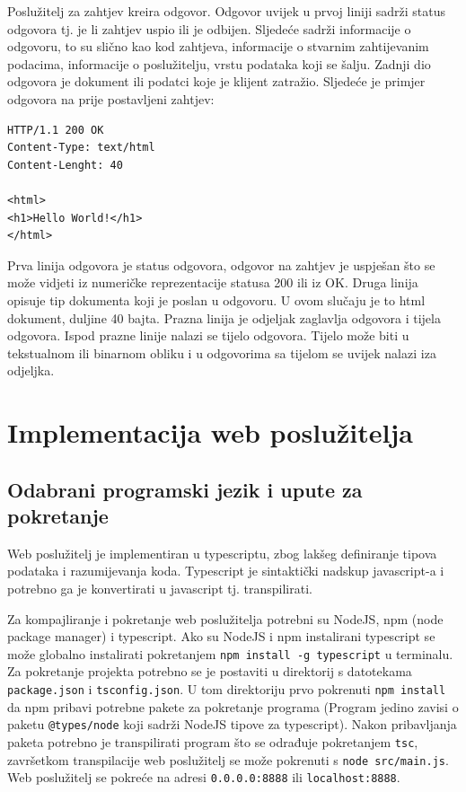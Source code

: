\documentclass[]{foi}
\begin{document}
Poslužitelj za zahtjev kreira odgovor. Odgovor uvijek u prvoj liniji sadrži status odgovora tj.
je li zahtjev uspio ili je odbijen. Sljedeće sadrži informacije o odgovoru, to su slično kao
kod zahtjeva, informacije o stvarnim zahtijevanim podacima, informacije o poslužitelju,
vrstu podataka koji se šalju. Zadnji dio odgovora je dokument ili podatci koje je klijent
zatražio. Sljedeće je primjer odgovora na prije postavljeni zahtjev:
\begin{verbatim}
HTTP/1.1 200 OK
Content-Type: text/html
Content-Lenght: 40

<html>
<h1>Hello World!</h1>
</html>
\end{verbatim}
Prva linija odgovora je status odgovora, odgovor na zahtjev je uspješan što se može vidjeti iz
numeričke reprezentacije statusa 200 ili iz OK. Druga linija opisuje tip dokumenta koji je poslan
u odgovoru. U ovom slučaju je to html dokument, duljine 40 bajta. Prazna linija je odjeljak
zaglavlja odgovora i tijela odgovora. Ispod prazne linije nalazi se tijelo odgovora. Tijelo može
biti u tekstualnom ili binarnom obliku i u odgovorima sa tijelom se uvijek nalazi iza odjeljka.

\chapter{Implementacija web poslužitelja}

\section{Odabrani programski jezik i upute za pokretanje} \label{sec:pokretanje}
Web poslužitelj je implementiran u typescriptu, zbog lakšeg definiranje tipova podataka
i razumijevanja koda. Typescript je sintaktički nadskup javascript-a i potrebno ga je
konvertirati u javascript tj. transpilirati.

Za kompajliranje i pokretanje web poslužitelja potrebni su NodeJS, npm (node package manager) i typescript.
Ako su NodeJS i npm instalirani typescript se može globalno instalirati pokretanjem \texttt{npm install -g typescript}
u terminalu. Za pokretanje projekta potrebno se je postaviti u direktorij s datotekama \texttt{package.json} i
\texttt{tsconfig.json}. U tom direktoriju prvo pokrenuti \texttt{npm install} da npm pribavi potrebne pakete
za pokretanje programa (Program jedino zavisi o paketu \texttt{@types/node} koji sadrži NodeJS tipove za typescript).
Nakon pribavljanja paketa potrebno je transpilirati program što se odrađuje pokretanjem \texttt{tsc}, završetkom
transpilacije web poslužitelj se može pokrenuti s \texttt{node src/main.js}. Web poslužitelj se pokreće na
adresi \texttt{0.0.0.0:8888} ili \texttt{localhost:8888}.
\end{document}
